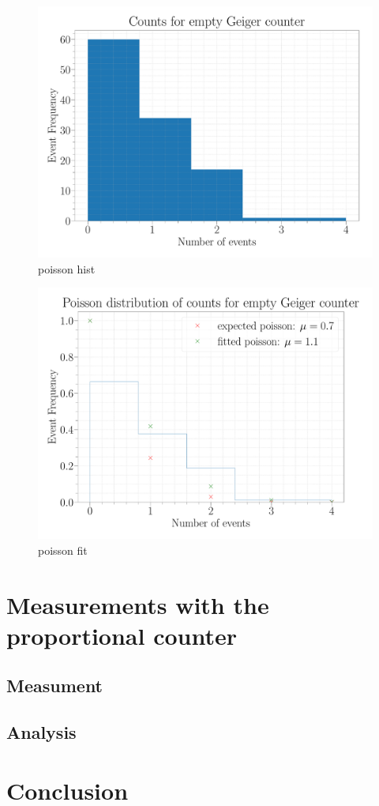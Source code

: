 \begin{figure}[H]
\centering
\includegraphics[width=\textwidth]{../Figures/Geiger_poisson_histogram.pdf}
\caption{poisson hist}
\label{fig:PoissonHist}
\end{figure}

\begin{figure}[H]
\centering
\includegraphics[width=\textwidth]{../Figures/Geiger_poisson_fit.pdf}
\caption{poisson fit}
\label{fig:PoissonFit}
\end{figure}

\section{Measurements with the proportional counter}

\subsection{Measument}

\subsection{Analysis}

\section{Conclusion}




